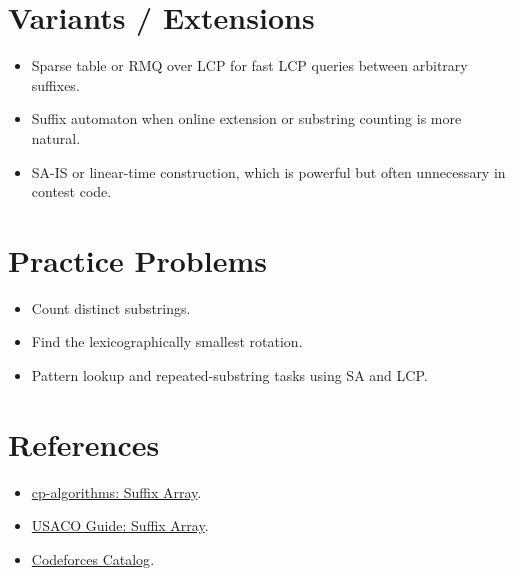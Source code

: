 \section*{Variants / Extensions}

\begin{itemize}
  \item Sparse table or RMQ over LCP for fast LCP queries between arbitrary suffixes.
  \item Suffix automaton when online extension or substring counting is more natural.
  \item SA-IS or linear-time construction, which is powerful but often unnecessary in contest code.
\end{itemize}

\section*{Practice Problems}

\begin{itemize}
  \item Count distinct substrings.
  \item Find the lexicographically smallest rotation.
  \item Pattern lookup and repeated-substring tasks using SA and LCP.
\end{itemize}

\section*{References}

\begin{itemize}
  \item \href{https://cp-algorithms.com/string/suffix-array.html}{cp-algorithms: Suffix Array}.
  \item \href{https://usaco.guide/adv/suffix-array?lang=cpp}{USACO Guide: Suffix Array}.
  \item \href{https://codeforces.com/catalog?locale=en}{Codeforces Catalog}.
\end{itemize}
